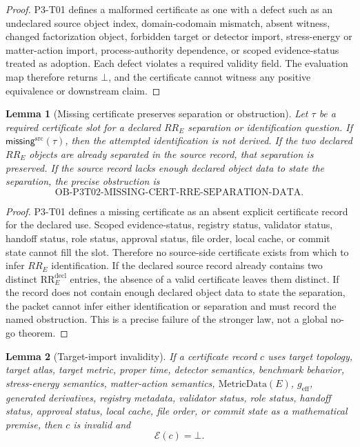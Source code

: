 \documentclass[11pt]{article}
\newcommand{\CMissing}{\mathsf{missing}^{\mathrm{src}}}
\newcommand{\Bottom}{\bot}
\newcommand{\RREObj}{\mathrm{RR}_{E}^{\mathrm{decl}}}
\newcommand{\MetricData}{\mathrm{MetricData}}
\newcommand{\geff}{g_{\mathrm{eff}}}
\newtheorem{lemma}{Lemma}
\begin{document}
\begin{proof}
P3-T01 defines a malformed certificate as one with a defect such as an
undeclared source object index, domain-codomain mismatch, absent witness,
changed factorization object, forbidden target or detector import,
stress-energy or matter-action import, process-authority dependence, or
scoped evidence-status treated as adoption. Each defect violates a required
validity field. The evaluation map therefore returns \(\Bottom\), and the
certificate cannot witness any positive equivalence or downstream claim.
\end{proof}

\begin{lemma}[Missing certificate preserves separation or obstruction]
Let \(\tau\) be a required certificate slot for a declared \(RR_E\) separation
or identification question. If \(\CMissing(\tau)\), then the attempted
identification is not derived. If the two declared \(RR_E\) objects are
already separated in the source record, that separation is preserved. If the
source record lacks enough declared object data to state the separation, the
precise obstruction is
\[
  \mathrm{OB\text{-}P3T02\text{-}MISSING\text{-}CERT\text{-}RRE\text{-}SEPARATION\text{-}DATA}.
\]
\end{lemma}

\begin{proof}
P3-T01 defines a missing certificate as an absent explicit certificate record
for the declared use. Scoped evidence-status, registry status, validator
status, handoff status, role status, approval status, file order, local cache,
or commit state cannot fill the slot. Therefore no source-side certificate
exists from which to infer \(RR_E\) identification. If the declared source
record already contains two distinct \(\RREObj\) entries, the absence of a
valid certificate leaves them distinct. If the record does not contain enough
declared object data to state the separation, the packet cannot infer either
identification or separation and must record the named obstruction. This is a
precise failure of the stronger law, not a global no-go theorem.
\end{proof}

\begin{lemma}[Target-import invalidity]
If a certificate record \(c\) uses target topology, target atlas, target
metric, proper time, detector semantics, benchmark behavior, stress-energy
semantics, matter-action semantics, \(\MetricData(E)\), \(\geff\), generated
derivatives, registry metadata, validator status, role status, handoff
status, approval status, local cache, file order, or commit state as a
mathematical premise, then \(c\) is invalid and
\[
  \mathcal E(c)=\Bottom.
\]
\end{lemma}
\end{document}
